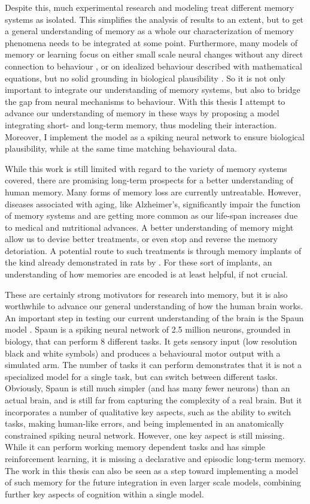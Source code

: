 Despite this, much experimental research and modeling treat different memory systems as isolated.
This simplifies the analysis of results to an extent, but to get a general understanding of memory as a whole our characterization of memory phenomena needs to be integrated at some point.
Furthermore, many models of memory or learning focus on either small scale neural changes without any direct connection to behaviour \parencite[e.g.,][]{Levy2005}, or on idealized behaviour
described with mathematical equations, but no solid grounding in biological plausibility \parencite[e.g.,][]{Milford2004}.
So it is not only important to integrate our understanding of memory systems, but also to bridge the gap from neural mechanisms to behaviour.
With this thesis I attempt to advance our understanding of memory in these ways by proposing a model integrating short- and long-term memory, thus modeling their interaction.
Moreover, I implement the model as a spiking neural network to ensure biological plausibility, while at the same time matching behavioural data.

While this work is still limited with regard to the variety of memory systems covered, there are promising long-term prospects for a better understanding of human memory.
Many forms of memory loss are currently untreatable.
However, diseases associated with aging, like Alzheimer's, significantly impair the function of memory systems and are getting more common as our life-span increases due to medical and nutritional advances.
A better understanding of memory might allow us to devise better treatments, or even stop and reverse the memory detoriation.
A potential route to such treatments is through memory implants of the kind already demonstrated in rats by \textcite{Berger2011}.
For these sort of implants, an understanding of how memories are encoded is at least helpful, if not crucial.

These are certainly strong motivators for research into memory, but it is also worthwhile to advance our general understanding of how the human brain works.
An important step in testing our current understanding of the brain is the Spaun model \parencite{Eliasmith2012}.
Spaun is a spiking neural network of 2.5 million neurons, grounded in biology, that can perform 8 different tasks.
It gets sensory input (low resolution black and white symbols) and produces a behavioural motor output with a simulated arm.
The number of tasks it can perform demonstrates that it is not a specialized model for a single task, but can switch between different tasks.
Obviously, Spaun is still much simpler (and has many fewer neurons) than an actual brain, and is still far from capturing the complexity of a real brain.
But it incorporates a number of qualitative key aspects, such as the ability to switch tasks, making human-like errors, and being implemented in an anatomically constrained spiking neural network.
However, one key aspect is still missing.
While it can perform working memory dependent tasks and has simple reinforcement learning, it is missing a declarative and episodic long-term memory.
The work in this thesis can also be seen as a step toward implementing a model of such memory for the future integration in even larger scale models, combining further key aspects of cognition within a single model.


